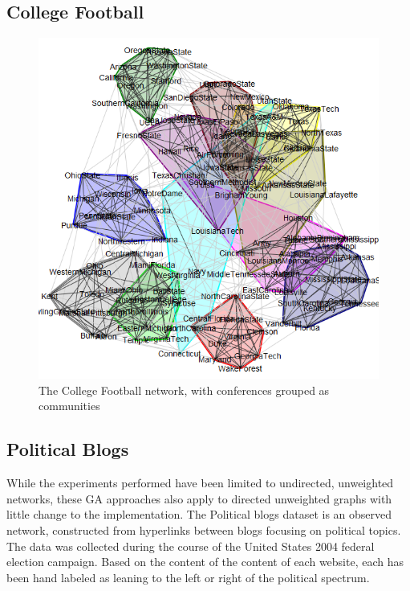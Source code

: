 \subsection{College Football}

\cite{Girvan2002}
\begin{figure}[!htb]
	\begin{center}
		\includegraphics[scale=.4]{images/football.png}
	\end{center}
	\caption{The College Football network, with conferences grouped as communities}
	\label{logo}
\end{figure}


\subsection{Political Blogs}
While the experiments performed have been limited to undirected, unweighted networks, these GA approaches also apply to directed unweighted graphs with little change to the implementation. The Political blogs dataset\cite{Adamic2005} is an observed network, constructed from hyperlinks between blogs focusing on political topics. The data was collected during the course of the United States 2004 federal election campaign. Based on the content of the content of each website, each has been hand labeled as leaning to the left or right of the political spectrum.

